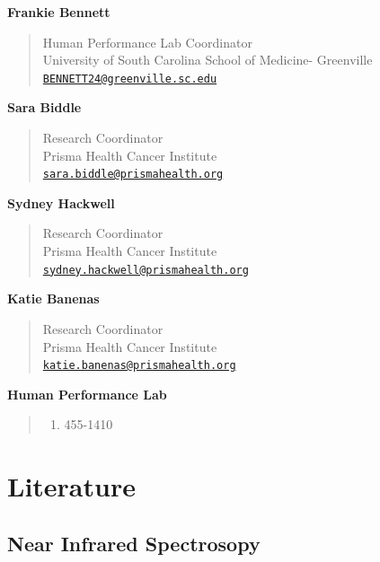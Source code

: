 \documentclass[
]{book}
\providecommand{\tightlist}{%
  \setlength{\itemsep}{0pt}\setlength{\parskip}{0pt}}
\begin{document}
\textbf{Frankie Bennett}

\begin{quote}
Human Performance Lab Coordinator\\
University of South Carolina School of Medicine- Greenville\\
\href{mailto:BENNETT24@greenville.sc.edu}{\nolinkurl{BENNETT24@greenville.sc.edu}}
\end{quote}

\textbf{Sara Biddle}

\begin{quote}
Research Coordinator\\
Prisma Health Cancer Institute\\
\href{mailto:sara.biddle@prismahealth.org}{\nolinkurl{sara.biddle@prismahealth.org}}
\end{quote}

\textbf{Sydney Hackwell}

\begin{quote}
Research Coordinator\\
Prisma Health Cancer Institute\\
\href{mailto:sydney.hackwell@prismahealth.org}{\nolinkurl{sydney.hackwell@prismahealth.org}}
\end{quote}

\textbf{Katie Banenas}

\begin{quote}
Research Coordinator\\
Prisma Health Cancer Institute\\
\href{mailto:katie.banenas@prismahealth.org}{\nolinkurl{katie.banenas@prismahealth.org}}
\end{quote}

\textbf{Human Performance Lab}

\begin{quote}
\begin{enumerate}
\def\labelenumi{(\arabic{enumi})}
\setcounter{enumi}{863}
\tightlist
\item
  455-1410
\end{enumerate}
\end{quote}

\hypertarget{Literature}{%
\chapter{Literature}\label{Literature}}

\hypertarget{Literature-nirs}{%
\section{Near Infrared Spectrosopy}\label{Literature-nirs}}
\end{document}
